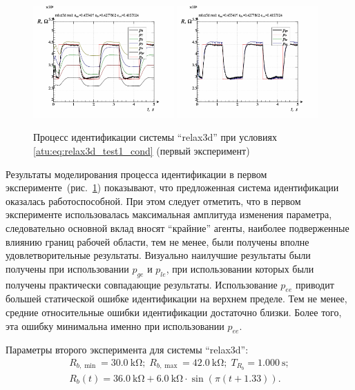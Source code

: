 \begin{figure}[htb!]
  \centerline{
    \includegraphics[width=0.48\textwidth]{p/relax3d_read_id2-p_p_00.png}
    \hfill
    \includegraphics[width=0.48\textwidth]{p/relax3d_read_id2-p_pp_00.png}
  }
  \caption{Процесс идентификации системы ``relax3d'' при условиях \ref{atu:eq:relax3d_test1_cond} (первый эксперимент)}
  \label{atu:f:relax3d_id_1}
\end{figure}

Результаты моделирования процесса идентификации в первом эксперименте~(рис.~\ref{atu:f:relax3d_id_1})
показывают, что предложенная система идентификации оказалась работоспособной.
При этом следует отметить, что в первом эксперименте использовалась максимальная
амплитуда изменения параметра, следовательно основной вклад вносят ``крайние'' агенты,
наиболее подверженные влиянию границ рабочей области, тем не менее,
были получены вполне удовлетворительные результаты.
Визуально наилучшие результаты были получены при использовании $p_{ge}$ и $p_{le}$,
при использовании которых были получены практически совпадающие результаты.
Использование $p_{ee}$ приводит большей статической ошибке идентификации на верхнем пределе.
Тем не менее, средние относительные ошибки идентификации достаточно близки.
Более того, эта ошибку минимальна именно при использовании $p_{ee}$.



Параметры второго эксперимента для системы ``relax3d'':
%
\begin{equation}
  \begin{array}{c}
    R_{b,\min} = \SI{30.0}{\kilo\ohm};
    \;
    R_{b,\max} = \SI{42.0}{\kilo\ohm};
    \;
    T_{R_b} = \SI{1.000}{\second};
  \\
    R_b(t) = \SI{36.0}{\kilo\ohm} + \SI{6.0}{\kilo\ohm} \cdot \sin( \pi ( t + 1.33 ) ).
  \end{array}
  \label{atu:eq:relax3d_test2_cond}
\end{equation}

